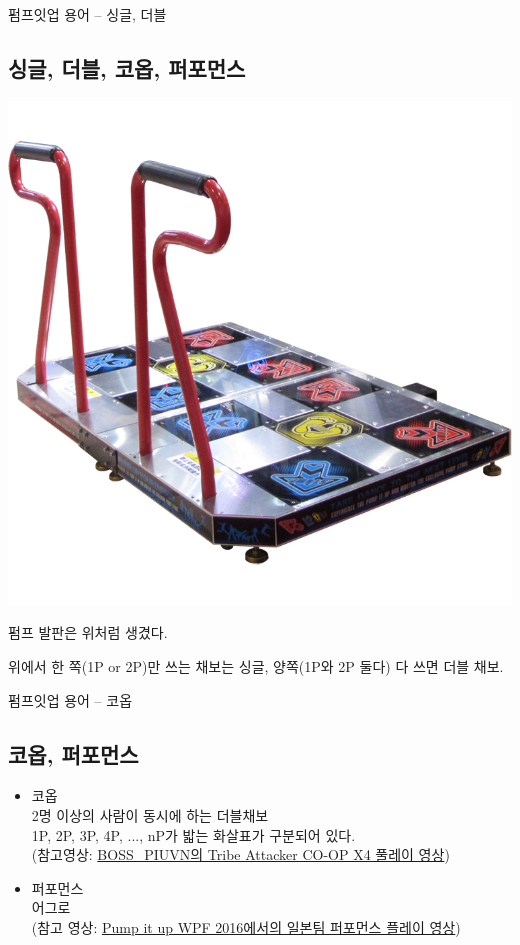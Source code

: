 \documentclass{beamer}
\begin{document}
\begin{frame}{펌프잇업 용어 -- 싱글, 더블}
	\subsection{싱글, 더블, 코옵, 퍼포먼스}

	\begin{center}
		\includegraphics[scale=0.6]{piu-pad.jpg}
	\end{center}
	펌프 발판은 위처럼 생겼다.

	위에서 한 쪽(1P or 2P)만 쓰는 채보는 싱글, 양쪽(1P와 2P 둘다) 다 쓰면 더블 채보.
\end{frame}

\begin{frame}{펌프잇업 용어 -- 코옵}
	\subsection{코옵, 퍼포먼스}
	\begin{itemize}
		\item 코옵 \\ 2명 이상의 사람이 동시에 하는 더블채보 \\ 1P, 2P, 3P, 4P, ..., nP가 밟는 화살표가 구분되어 있다. \\ (참고영상: \href{https://www.youtube.com/watch?v=hr1w7kXJqgA}{BOSS\_PIUVN의 Tribe Attacker CO-OP X4 풀레이 영상})
		\item 퍼포먼스 \\ 어그로 \\ (참고 영상: \href{https://www.youtube.com/watch?v=PqCh-_Tvbf8}{Pump it up WPF 2016에서의 일본팀 퍼포먼스 플레이 영상})
	\end{itemize}
\end{frame}
\end{document}
